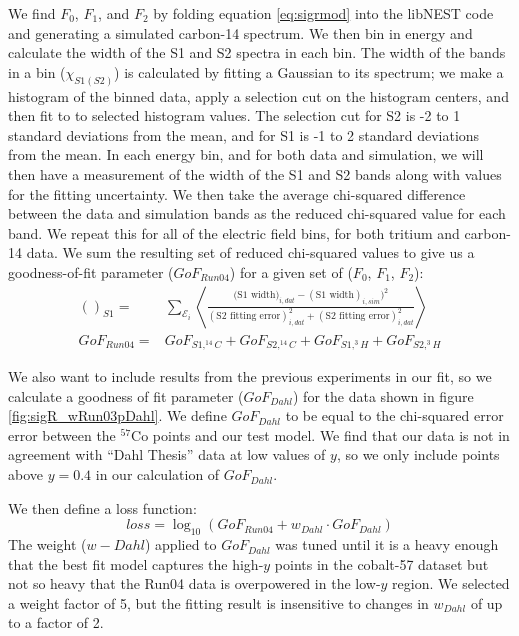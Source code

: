 We find $F_0$, $F_1$, and $F_2$ by folding equation \ref{eq:sigrmod} into the libNEST code and generating a simulated carbon-14 spectrum. We then bin in energy and calculate the width of the S1 and S2 spectra in each bin. The width of the bands in a bin ($\chi_{S1(S2)}$) is calculated by fitting a Gaussian to its spectrum; we make a histogram of the binned data, apply a selection cut on the histogram centers, and then fit to to selected histogram values. The selection cut for S2 is -2 to 1 standard deviations from the mean, and for S1 is -1 to 2 standard deviations from the mean. In each energy bin, and for both data and simulation, we will then have a measurement of the width of the S1 and S2 bands along with values for the fitting uncertainty. We then take the average chi-squared difference between the data and simulation bands as the reduced chi-squared value for each band. We repeat this for all of the electric field bins, for both tritium and carbon-14 data. We sum the resulting set of reduced chi-squared values to give us a goodness-of-fit parameter ($GoF_{Run04}$) for a given set of ($F_0$, $F_1$, $F_2$):
\begin{equation}
\begin{split}
()_{S1}=&\sum_{\mathcal{E}_i}\left\langle \frac{\bigg(\text{S1 width})_{i,dat}-(\text{S1 width})_{i,sim}\bigg)^2}{(\text{S2 fitting error})_{i,dat}^2+(\text{S2 fitting error})_{i,dat}^2}\right\rangle \\[1em]
GoF_{Run04}=&GoF_{S1,^{14}C}+GoF_{S2,^{14}C}+GoF_{S1,^3H}+GoF_{S2,^3H}
\end{split}
\end{equation}

We also want to include results from the previous experiments in our fit, so we calculate a goodness of fit parameter ($GoF_{Dahl}$) for the data shown in figure \ref{fig:sigR_wRun03pDahl}. We define $GoF_{Dahl}$ to be equal to the chi-squared error error between the $^{57}$Co points and our test model. We find that our data is not in agreement with ``Dahl Thesis'' data at low values of $y$, so we only include points above $y=0.4$ in our calculation of $GoF_{Dahl}$. 

We then define a loss function:
\begin{equation}
loss=\log_{10}(GoF_{Run04}+w_{Dahl}\cdot GoF_{Dahl})
\end{equation}
The weight ($w-{Dahl}$) applied to $GoF_{Dahl}$ was tuned until it is a heavy enough that the best fit model captures the high-$y$ points in the cobalt-57 dataset but not so heavy that the Run04 data is overpowered in the low-$y$ region. We selected a weight factor of 5, but the fitting result is insensitive to changes in $w_{Dahl}$ of up to a factor of 2.


